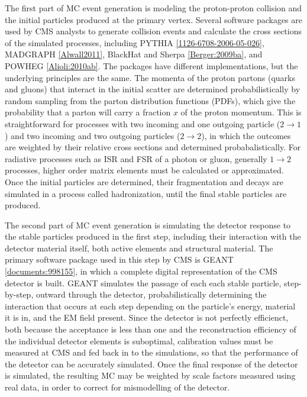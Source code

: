\indent The first part of MC event generation is modeling the proton-proton collision and the initial particles produced at the primary vertex. Several software packages are used by CMS analysts to generate collision events and calculate the cross sections of the simulated processes, including PYTHIA \ref{1126-6708-2006-05-026}, MADGRAPH \ref{Alwall2011}, BlackHat and Sherpa \ref{Berger:2009ba}, and POWHEG \ref{Alioli:2010ab}. The packages have different implementations, but the underlying principles are the same. The momenta of the proton partons (quarks and gluons) that interact in the initial scatter are determined probabilistically by random sampling from the parton distribution functions (PDFs), which give the probability that a parton will carry a fraction $x$ of the proton momentum. This is straightforward for processes with two incoming and one outgoing particle ($2 \rightarrow 1$) and two incoming and two outgoing particles ($2 \rightarrow 2$), in which the outcomes are weighted by their relative cross sections and determined probabalistically. For radiative processes such as ISR and FSR of a photon or gluon, generally $1 \rightarrow 2$ processes, higher order matrix elements must be calculated or approximated. Once the initial particles are determined, their fragmentation and decays are simulated in a process called hadronization, until the final stable particles are produced. 

\indent The second part of MC event generation is simulating the detector response to the stable particles produced in the first step, including their interaction with the detector material itself, both active elements and structural material. The primary software package used in this step by CMS is GEANT \ref{documents:998155}, in which a complete digital representation of the CMS detector is built. GEANT simulates the passage of each each stable particle, step-by-step, outward through the detector, probabilistically determining the interaction that occurs at each step depending on the particle's energy,  material it is in, and the EM field present. Since the detector is not perfectly efficienct, both because the acceptance is less than one and the reconstruction efficiency of the individual detector elements is suboptimal, calibration values must be measured at CMS and fed back in to the simulations, so that the performance of the detector can be accurately simulated. Once the final response of the detector is simulated, the resulting MC may be weighted by scale factors measured using real data, in order to correct for mismodelling of the detector.


